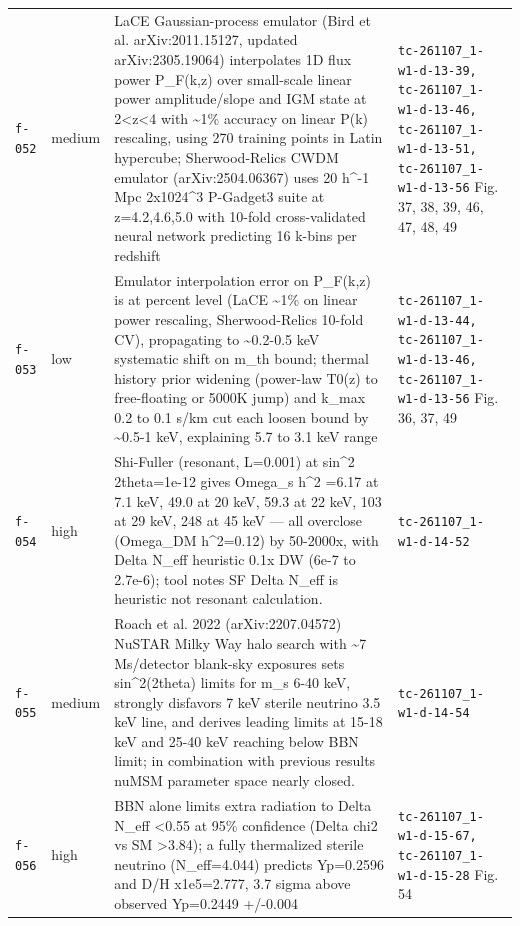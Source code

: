 \documentclass[11pt,a4paper]{article}
\begin{document}
\begin{longtable}{@{}p{}p{}p{}p{}@{}}
\texttt{f-052} & medium & LaCE Gaussian-process emulator (Bird et al. arXiv:2011.15127, updated arXiv:2305.19064) interpolates 1D flux power P\_F(k,z) over small-scale linear power amplitude/slope and IGM state at 2\textless{}z\textless{}4 with \textasciitilde{}1\% accuracy on linear P(k) rescaling, using 270 training points in Latin hypercube; Sherwood-Relics CWDM emulator (arXiv:2504.06367) uses 20 h\textasciicircum{}-1 Mpc 2x1024\textasciicircum{}3 P-Gadget3 suite at z=4.2,4.6,5.0 with 10-fold cross-validated neural network predicting 16 k-bins per redshift & \texttt{tc-261107\_\allowbreak{}1-w1-d-13-39,\allowbreak{} tc-261107\_\allowbreak{}1-w1-d-13-46,\allowbreak{} tc-261107\_\allowbreak{}1-w1-d-13-51,\allowbreak{} tc-261107\_\allowbreak{}1-w1-d-13-56} Fig. 37, 38, 39, 46, 47, 48, 49 \\
\texttt{f-053} & low & Emulator interpolation error on P\_F(k,z) is at percent level (LaCE \textasciitilde{}1\% on linear power rescaling, Sherwood-Relics 10-fold CV), propagating to \textasciitilde{}0.2-0.5 keV systematic shift on m\_th bound; thermal history prior widening (power-law T0(z) to free-floating or 5000K jump) and k\_max 0.2 to 0.1 s/km cut each loosen bound by \textasciitilde{}0.5-1 keV, explaining 5.7 to 3.1 keV range & \texttt{tc-261107\_\allowbreak{}1-w1-d-13-44,\allowbreak{} tc-261107\_\allowbreak{}1-w1-d-13-46,\allowbreak{} tc-261107\_\allowbreak{}1-w1-d-13-56} Fig. 36, 37, 49 \\
\texttt{f-054} & high & Shi-Fuller (resonant, L=0.001) at sin\textasciicircum{}2 2theta=1e-12 gives Omega\_s h\textasciicircum{}2 =6.17 at 7.1 keV, 49.0 at 20 keV, 59.3 at 22 keV, 103 at 29 keV, 248 at 45 keV --- all overclose (Omega\_DM h\textasciicircum{}2=0.12) by 50-2000x, with Delta N\_eff heuristic 0.1x DW (6e-7 to 2.7e-6); tool notes SF Delta N\_eff is heuristic not resonant calculation. & \texttt{tc-261107\_\allowbreak{}1-w1-d-14-52} \\
\texttt{f-055} & medium & Roach et al. 2022 (arXiv:2207.04572) NuSTAR Milky Way halo search with \textasciitilde{}7 Ms/detector blank-sky exposures sets sin\textasciicircum{}2(2theta) limits for m\_s 6-40 keV, strongly disfavors 7 keV sterile neutrino 3.5 keV line, and derives leading limits at 15-18 keV and 25-40 keV reaching below BBN limit; in combination with previous results nuMSM parameter space nearly closed. & \texttt{tc-261107\_\allowbreak{}1-w1-d-14-54} \\
\texttt{f-056} & high & BBN alone limits extra radiation to Delta N\_eff \textless{}0.55 at 95\% confidence (Delta chi2 vs SM \textgreater{}3.84); a fully thermalized sterile neutrino (N\_eff=4.044) predicts Yp=0.2596 and D/H x1e5=2.777, 3.7 sigma above observed Yp=0.2449 +/-0.004 & \texttt{tc-261107\_\allowbreak{}1-w1-d-15-67,\allowbreak{} tc-261107\_\allowbreak{}1-w1-d-15-28} Fig. 54 \\

\end{longtable}
\end{document}
